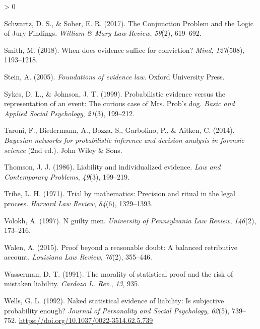 \documentclass[
  10pt,
  dvipsnames,enabledeprecatedfontcommands]{scrartcl}
\newlength{\cslhangindent}
\newenvironment{CSLReferences}[2] %
 {%
  \setlength{\parindent}{0pt}
  \ifodd #1 \everypar{\setlength{\hangindent}{\cslhangindent}}\ignorespaces\fi
  \ifnum #2 > 0
  \setlength{\parskip}{#2\baselineskip}
  \fi
 }%
 {}
\begin{document}
\begin{CSLReferences}{1}{0}
\leavevmode\hypertarget{ref-schwartz2017ConjunctionProblemLogic}{}%
Schwartz, D. S., \& Sober, E. R. (2017). The {Conjunction Problem} and
the {Logic} of {Jury Findings}. \emph{William \& Mary Law Review},
\emph{59}(2), 619--692.

\leavevmode\hypertarget{ref-smith2017}{}%
Smith, M. (2018). When does evidence suffice for conviction?
\emph{Mind}, \emph{127}(508), 1193--1218.

\leavevmode\hypertarget{ref-Stein05}{}%
Stein, A. (2005). \emph{Foundations of evidence law}. Oxford University
Press.

\leavevmode\hypertarget{ref-sykes1999}{}%
Sykes, D. L., \& Johnson, J. T. (1999). Probabilistic evidence versus
the representation of an event: The curious case of {Mrs.} {Prob}'s dog.
\emph{Basic and Applied Social Psychology}, \emph{21}(3), 199--212.

\leavevmode\hypertarget{ref-taroni2006bayesian}{}%
Taroni, F., Biedermann, A., Bozza, S., Garbolino, P., \& Aitken, C.
(2014). \emph{Bayesian networks for probabilistic inference and decision
analysis in forensic science} (2nd ed.). John Wiley \& Sons.

\leavevmode\hypertarget{ref-thomson1986liability}{}%
Thomson, J. J. (1986). Liability and individualized evidence. \emph{Law
and Contemporary Problems}, \emph{49}(3), 199--219.

\leavevmode\hypertarget{ref-tribe1971trial}{}%
Tribe, L. H. (1971). Trial by mathematics: Precision and ritual in the
legal process. \emph{Harvard Law Review}, \emph{84}(6), 1329--1393.

\leavevmode\hypertarget{ref-voloch1997}{}%
Volokh, A. (1997). {N} guilty men. \emph{University of Pennsylvania Law
Review}, \emph{146}(2), 173--216.

\leavevmode\hypertarget{ref-walen2015}{}%
Walen, A. (2015). Proof beyond a reasonable doubt: A balanced
retributive account. \emph{Louisiana Law Review}, \emph{76}(2),
355--446.

\leavevmode\hypertarget{ref-wasserman1991morality}{}%
Wasserman, D. T. (1991). The morality of statistical proof and the risk
of mistaken liability. \emph{Cardozo L. Rev.}, \emph{13}, 935.

\leavevmode\hypertarget{ref-wells1992naked}{}%
Wells, G. L. (1992). Naked statistical evidence of liability: Is
subjective probability enough? \emph{Journal of Personality and Social
Psychology}, \emph{62}(5), 739--752.
\url{https://doi.org/10.1037/0022-3514.62.5.739}

\end{CSLReferences}
\end{document}
